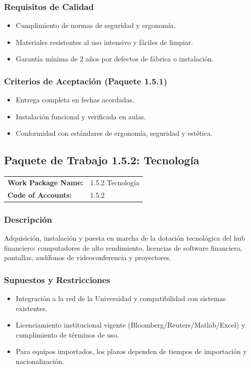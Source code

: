 \subsubsection*{Requisitos de Calidad}
\begin{itemize}
    \item Cumplimiento de normas de seguridad y ergonomía.
    \item Materiales resistentes al uso intensivo y fáciles de limpiar.
    \item Garantía mínima de 2 años por defectos de fábrica o instalación.
\end{itemize}

\subsubsection*{Criterios de Aceptación (Paquete 1.5.1)}
\begin{itemize}
    \item Entrega completa en fechas acordadas.
    \item Instalación funcional y verificada en aulas.
    \item Conformidad con estándares de ergonomía, seguridad y estética.
\end{itemize}

\subsection{Paquete de Trabajo 1.5.2: Tecnología}
\label{sec:wbs152}

\begin{tabularx}{\textwidth}{@{}lX@{}}
\textbf{Work Package Name:} & 1.5.2 Tecnología \\
\textbf{Code of Accounts:} & 1.5.2 \\
\end{tabularx}

\subsubsection*{Descripción}
Adquisición, instalación y puesta en marcha de la dotación tecnológica del hub financiero: computadores de alto rendimiento, licencias de software financiero, pantallas, audífonos de videoconferencia y proyectores.

\subsubsection*{Supuestos y Restricciones}
\begin{itemize}
    \item Integración a la red de la Universidad y compatibilidad con sistemas existentes.
    \item Licenciamiento institucional vigente (Bloomberg/Reuters/Matlab/Excel) y cumplimiento de términos de uso.
    \item Para equipos importados, los plazos dependen de tiempos de importación y nacionalización.
\end{itemize}

